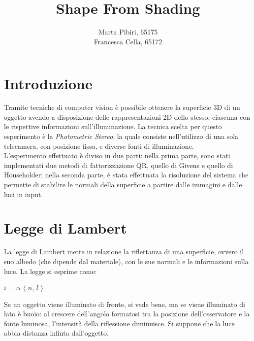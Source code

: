 \documentclass[]{scrartcl}
\title{Shape From Shading}
\author{Marta Pibiri, 65175\\Francesca Cella, 65172}
\begin{document}
\maketitle

\section{Introduzione}
Tramite tecniche di computer vision è possibile ottenere la superficie 3D di un oggetto avendo a disposizione delle rappresentazioni 2D dello stesso, ciascuna con le rispettive informazioni sull'illuminazione. La tecnica scelta per questo esperimento è la \textit{Photometric Stereo}, la quale consiste nell'utilizzo di una sola telecamera, con posizione fissa, e diverse fonti di illuminazione.\\%
L'esperimento effettuato è diviso in due parti: nella prima parte, sono stati implementati due metodi di fattorizzazione QR, quello di Givens e quello di Householder; nella seconda parte, è stata effettuata la risoluzione del sistema che permette di stabilire le normali della superficie a partire dalle immagini e dalle luci in input. %

\section{Legge di Lambert}
La legge di Lambert mette in relazione la riflettanza di una superficie, ovvero il suo albedo (che dipende dal materiale), con le sue normali e le informazioni sulla luce. La legge si esprime come:\\%
\begin{center}
	$i$ = $\alpha$ $\langle$ \underline{$n$}, \underline{$l$} $\rangle$
\end{center}
Se un oggetto viene illuminato di fronte, si vede bene, ma se viene illuminato di lato è buoio: al crescere dell'angolo formatosi tra la posizione dell'osservatore e la fonte luminosa, l'intensità della riflessione diminuisce. %
Si suppone che la luce abbia distanza infinta dall'oggetto.
\end{document}
